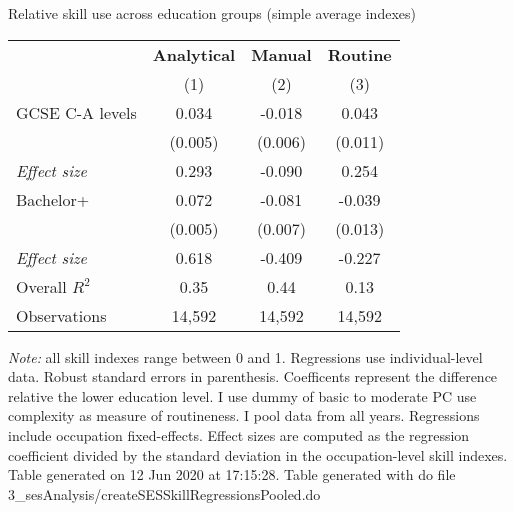 \begin{center}
\begin{threeparttable}[!h]
\caption{Relative skill use across education groups (simple average indexes)}
\label{tab:skillRegs}
\begin{tabular}{lccc}
\toprule
\toprule
&\multicolumn{1}{c}{\textbf{Analytical}}&\multicolumn{1}{c}{\textbf{Manual}}&\multicolumn{1}{c}{\textbf{Routine}} \\
\textbf{}&\multicolumn{1}{c}{(1)}&\multicolumn{1}{c}{(2)}&\multicolumn{1}{c}{(3)} \\
\midrule
GCSE C-A levels     &       0.034\sym{***}&      -0.018\sym{**} &       0.043\sym{***}\\
                    &     (0.005)         &     (0.006)         &     (0.011)         \\
\hspace{3mm}\textit{Effect size}\vspace{4mm}&       0.293         &      -0.090         &       0.254         \\
\midrule Bachelor+  &       0.072\sym{***}&      -0.081\sym{***}&      -0.039\sym{**} \\
                    &     (0.005)         &     (0.007)         &     (0.013)         \\
\hspace{3mm}\textit{Effect size}&       0.618         &      -0.409         &      -0.227         \\
\midrule Overall $ R^2$&        0.35         &        0.44         &        0.13         \\
Observations        &      14,592         &      14,592         &      14,592         \\
\bottomrule
\bottomrule
\end{tabular}
\begin{tablenotes}
\item \footnotesize \textit{Note:} all skill indexes range between 0 and 1. Regressions use individual-level data. Robust standard errors in parenthesis. Coefficents represent the difference relative the lower education level. I use dummy of basic to moderate PC use complexity as measure of routineness. I pool data from all years. Regressions include occupation fixed-effects. Effect sizes are computed as the regression coefficient divided by the standard deviation in the occupation-level skill indexes. Table generated on 12 Jun 2020 at 17:15:28. Table generated with do file 3\_sesAnalysis/createSESSkillRegressionsPooled.do
\end{tablenotes}
\end{threeparttable}
\end{center}
